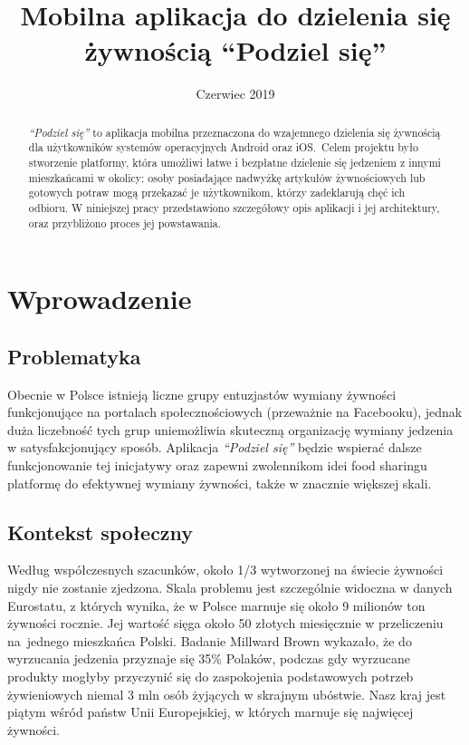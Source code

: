 \documentclass[licencjacka]{pracamgr}
\title{Mobilna aplikacja do dzielenia się żywnością ``Podziel się''}
\date{Czerwiec 2019}
\begin{document}
\maketitle

\begin{abstract}
\textit{``Podziel się''} to aplikacja mobilna przeznaczona do wzajemnego dzielenia się żywnością dla użytkowników systemów operacyjnych Android oraz iOS.\ Celem projektu było stworzenie platformy, która umożliwi łatwe i bezpłatne dzielenie się jedzeniem z innymi mieszkańcami w okolicy: osoby posiadające nadwyżkę artykułów żywnościowych lub gotowych potraw mogą przekazać je użytkownikom, którzy zadeklarują chęć ich odbioru. W niniejszej pracy przedstawiono szczegółowy opis aplikacji i jej architektury, oraz przybliżono proces jej powstawania.
\end{abstract}

\tableofcontents

\chapter*{Wprowadzenie}
\section*{Problematyka}
Obecnie w Polsce istnieją liczne grupy entuzjastów wymiany żywności funkcjonujące na portalach społecznościowych (przeważnie na Facebooku), jednak duża liczebność tych grup uniemożliwia skuteczną organizację wymiany jedzenia w satysfakcjonujący sposób. Aplikacja \textit{``Podziel się''} będzie wspierać dalsze funkcjonowanie tej inicjatywy oraz zapewni zwolennikom idei food sharingu platformę do efektywnej wymiany żywności, także w znacznie większej skali.

\section*{Kontekst społeczny}
Według współczesnych szacunków, około 1/3 wytworzonej na świecie żywności nigdy nie zostanie zjedzona. Skala problemu jest szczególnie widoczna w danych Eurostatu, z których wynika, że w Polsce marnuje się około 9 milionów ton żywności rocznie. Jej wartość sięga około 50 złotych miesięcznie w przeliczeniu na~jednego mieszkańca Polski. Badanie Millward Brown wykazało, że do wyrzucania jedzenia przyznaje się 35\% Polaków, podczas gdy wyrzucane produkty mogłyby przyczynić się do zaspokojenia podstawowych potrzeb żywieniowych niemal 3 mln osób żyjących w skrajnym ubóstwie. Nasz kraj jest piątym wśród państw Unii Europejskiej, w których marnuje się najwięcej żywności.
\end{document}
